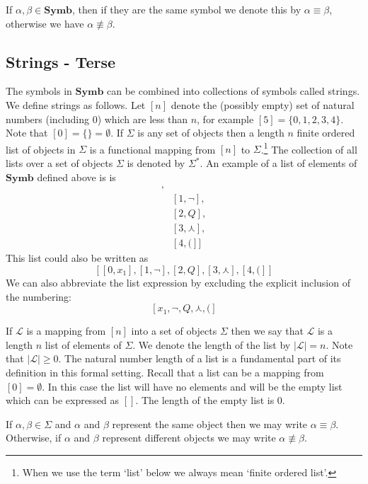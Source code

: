 \documentclass[12pt]{article}
\newcommand{\mc}[1]{\mathcal{#1}}
\begin{document}
\vspace{1cm}

If $\alpha, \beta \in \textbf{Symb}$, then if they are the same symbol we denote this by $\alpha \equiv \beta$, otherwise we have $\alpha \not \equiv \beta$.

\subsection{Strings - Terse}

The symbols in $\textbf{Symb}$ can be combined into collections of symbols called strings.
We define strings as follows.
Let $[n]$ denote the (possibly empty) set of natural numbers (including 0) which are less than $n$, for example $[5] = \{0, 1, 2, 3, 4\}$.
Note that $[0] = \{\} = \emptyset$.
If $\Sigma$ is any set of objects then a length $n$ finite ordered list of objects in $\Sigma$ is a functional mapping from $[n]$ to $\Sigma$.\footnote{When we use the term `list' below we always mean `finite ordered list'.} The collection of all lists over a set of objects $\Sigma$ is denoted by $\Sigma^*$.
An example of a list of elements of $\textbf{Symb}$ defined above is is
\begin{align*}
[&[0, x_1],\\
&[1, \lnot],\\
&[2, Q],\\
&[3, \curlywedge],\\
&[4, (]]
\end{align*}
This list could also be written as
$$
[[0, x_1], [1, \lnot], [2, Q], [3, \curlywedge], [4, (]]
$$
We can also abbreviate the list expression by excluding the explicit inclusion of the numbering:
$$
[x_1, \lnot, Q, \curlywedge, (]
$$

If $\mc{L}$ is a mapping from $[n]$ into a set of objects $\Sigma$ then we say that $\mc{L}$ is a length $n$ list of elements of $\Sigma$.
We denote the length of the list by $|\mc{L}| = n$.
Note that $|\mc{L}| \ge 0$.
The natural number length of a list is a fundamental part of its definition in this formal setting.
Recall that a list can be a mapping from $[0] = \emptyset$.
In this case the list will have no elements and will be the empty list which can be expressed as $[]$.
The length of the empty list is $0$.

If $\alpha, \beta \in \Sigma$ and $\alpha$ and $\beta$ represent the same object then we may write $\alpha \equiv \beta$.
Otherwise, if $\alpha$ and $\beta$ represent different objects we may write $\alpha \not \equiv \beta$.
\end{document}
